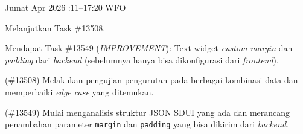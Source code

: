 \begin{logtable}
    {
        Jumat  Apr 2026 :11--17:20 \linebreak %
        WFO
    }{
        \begin{loglist}
            \item Melanjutkan Task \#13508.
            \item Mendapat Task \#13549 (\textit{IMPROVEMENT}): Text widget \textit{custom
                margin} dan \textit{padding} dari \textit{backend} (sebelumnya hanya bisa
            dikonfigurasi dari \textit{frontend}).
        \end{loglist}
    }{
        \begin{logwork}
            \item (\#13508) Melakukan pengujian pengurutan pada berbagai kombinasi data dan memperbaiki \textit{edge case} yang ditemukan.
            \item (\#13549) Mulai menganalisis struktur JSON SDUI yang ada dan merancang penambahan parameter \texttt{margin} dan \texttt{padding} yang bisa dikirim dari \textit{backend}.
        \end{logwork}
    }



\end{logtable}
